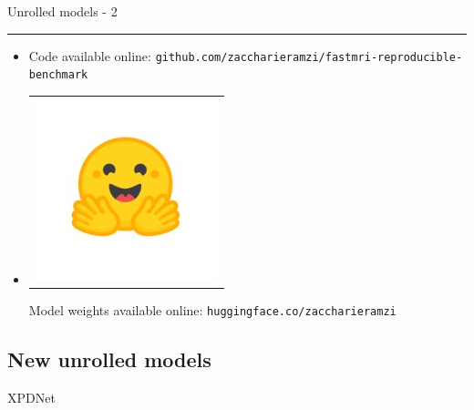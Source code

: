 \begin{frame}{Unrolled models - 2}
\begin{overprint}
    \noindent\rule{\textwidth}{1pt}

        \begin{itemize}
            \item {} Code available online: \texttt{github.com/zaccharieramzi/fastmri-reproducible-benchmark}
            \item\begin{tabular}{@{}c@{}}\includegraphics[width=3ex]{Figures/hf_logo.jpeg}\end{tabular}Model weights available online: \texttt{huggingface.co/zaccharieramzi}
        \end{itemize}
    
\end{overprint}
    


\end{frame}

\subsection{New unrolled models}

\begin{frame}{XPDNet}
    
\end{frame}

